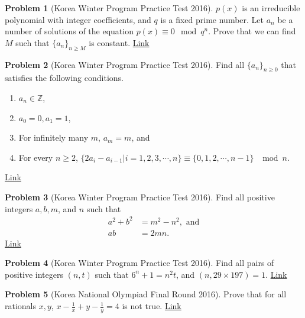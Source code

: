 \documentclass[]{article}
\theoremstyle{definition}
\newtheorem{problem}{Problem}
\begin{document}
\begin{problem}[Korea Winter Program Practice Test 2016]
	$p(x)$ is an irreducible polynomial with integer coefficients, and $q$ is a fixed prime number. Let $a_n$ be a number of solutions of the equation $p(x)\equiv 0\mod q^n$. Prove that we can find $M$ such that $\{a_n\}_{n\ge M}$ is constant. \hfill \href{http://artofproblemsolving.com/community/c6h1190175p5802127}{Link}
\end{problem}





\begin{problem}[Korea Winter Program Practice Test 2016]
	Find all $\{a_n\}_{n\ge 0}$ that satisfies the following conditions.
		\begin{enumerate}
			\item $a_n\in \mathbb{Z}$,
			\item $a_0=0, a_1=1$,
			\item For infinitely many $m$, $a_m=m$, and
			\item For every $n\ge2$, $\{2a_i-a_{i-1} | i=1, 2, 3, \cdots , n\}\equiv \{0, 1, 2, \cdots , n-1\}$ $\mod n$.
		\end{enumerate}
	\hfill \href{http://artofproblemsolving.com/community/c6h1189496p5795891}{Link}
\end{problem}




\begin{problem}[Korea Winter Program Practice Test 2016]
	Find all positive integers $a, b, m$, and $n$ such that
		\begin{align*}
			a^2+b^2 &=m^2-n^2, \text{ and}\\
			ab &=2mn.
		\end{align*}
	\hfill \href{http://artofproblemsolving.com/community/c6h1189489p5795855}{Link}
\end{problem}



\begin{problem}[Korea Winter Program Practice Test 2016]
	Find all pairs of positive integers $(n,t)$ such that $6^n+1=n^2t$, and $(n,29 \times 197)=1$. \hfill \href{http://artofproblemsolving.com/community/c6h1189502p5795910}{Link}
\end{problem}




\begin{problem}[Korea National Olympiad Final Round 2016]
	Prove that for all rationals $x,y$, $x-\frac{1}{x}+y-\frac{1}{y}=4$ is not true. \hfill \href{http://artofproblemsolving.com/community/c6h1214200p6032947}{Link}
\end{problem}
\end{document}

